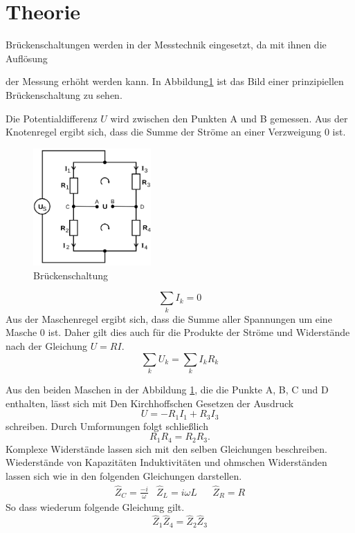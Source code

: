 \section{Theorie}
\label{sec:Theorie}

\cite{sample}

Brückenschaltungen werden in der Messtechnik eingesetzt, da mit ihnen die Auflösung

der Messung erhöht werden kann.
In Abbildung\ref{fig:Brueckenschaltung} ist das Bild einer prinzipiellen Brückenschaltung zu sehen.

Die Potentialdifferenz $U$ wird zwischen den Punkten A und B gemessen. Aus der
Knotenregel ergibt sich, dass die Summe der Ströme an einer Verzweigung $0$ ist.


\begin{figure}
  \centering
  \includegraphics[width=0.4\textwidth]{Bilder/Brueckenschaltung.png}
  \caption{Brückenschaltung}
  \label{fig:Brueckenschaltung}
\end{figure}
\begin{equation}
  \sum \limits_{k} I_k= 0
  \label{eq:knotenregel}
\end{equation}
Aus der Maschenregel ergibt sich, dass die Summe aller Spannungen um eine Masche
$0$ ist. Daher gilt dies auch für die Produkte der Ströme und Widerstände nach
der Gleichung $U=RI$.
\begin{equation}
  \sum \limits_{k} U_k=  \sum \limits_{k} I_k R_k
  \label{eq:Maschenregel}
\end{equation}

Aus den beiden Maschen in der Abbildung \ref{fig:Brueckenschaltung}, die die Punkte
A, B, C und D enthalten, lässt sich mit Den Kirchhoffschen Gesetzen
der Ausdruck
\begin{equation}
  U=-R_1 I_1 + R_3 I_3
\end{equation}
schreiben. Durch Umformungen folgt schließlich
\begin{equation}
  R_1 R_4 =R_2 R_3   .
  \label{eq:Widerstand}
\end{equation}
Komplexe Widerstände lassen sich mit den selben Gleichungen beschreiben.
Wiederstände von Kapazitäten Induktivitäten und ohmschen Widerständen lassen sich
wie in den folgenden Gleichungen darstellen.
\begin{align}
&\hat{Z}_C = \frac{-i}{\omega}  &  \hat{Z}_L=i\omega L & & \hat{Z}_R = R &
\end{align}
So dass wiederum folgende Gleichung gilt.
\begin{equation}
\hat{Z}_1\hat{Z}_4=\hat{Z}_2\hat{Z}_3
\end{equation}
